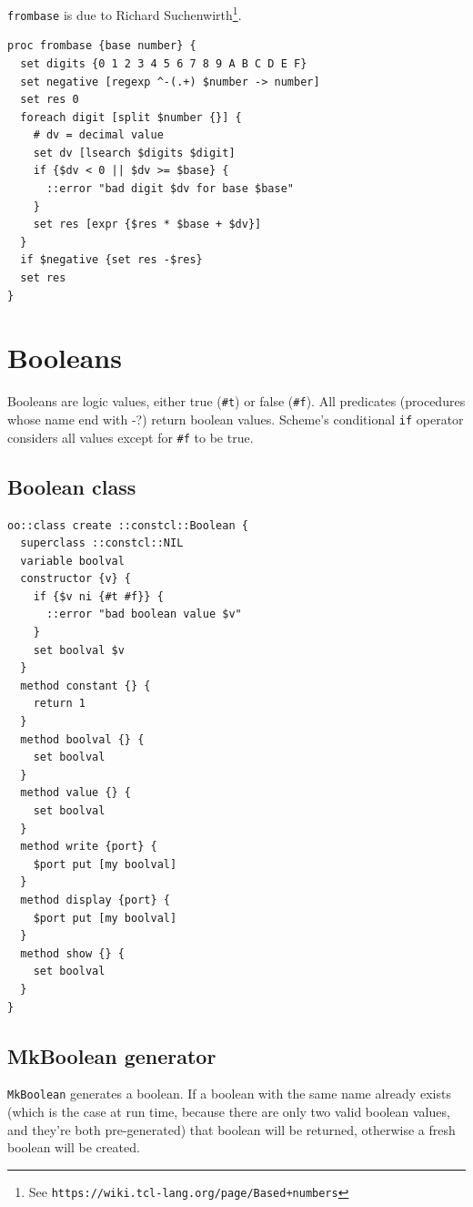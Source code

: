 \documentclass[twoside,9pt]{report}
\begin{document}
\texttt{frombase} is due to Richard Suchenwirth\footnote{See \texttt{https://wiki.tcl-lang.org/page/Based+numbers}}.

\begin{lstlisting}
proc frombase {base number} {
  set digits {0 1 2 3 4 5 6 7 8 9 A B C D E F}
  set negative [regexp ^-(.+) $number -> number]
  set res 0
  foreach digit [split $number {}] {
    # dv = decimal value
    set dv [lsearch $digits $digit]
    if {$dv < 0 || $dv >= $base} {
      ::error "bad digit $dv for base $base"
    }
    set res [expr {$res * $base + $dv}]
  }
  if $negative {set res -$res}
  set res
}
\end{lstlisting}
\section{Booleans}
\label{booleans}


Booleans are logic values, either true (\texttt{\#t}) or false (\texttt{\#f}). All predicates (procedures whose name end with -?) return boolean values. Scheme's conditional \texttt{if} operator considers all values except for \texttt{\#f} to be true.

\subsection{Boolean class}
\label{boolean-class}
\begin{lstlisting}
oo::class create ::constcl::Boolean {
  superclass ::constcl::NIL
  variable boolval
  constructor {v} {
    if {$v ni {#t #f}} {
      ::error "bad boolean value $v"
    }
    set boolval $v
  }
  method constant {} {
    return 1
  }
  method boolval {} {
    set boolval
  }
  method value {} {
    set boolval
  }
  method write {port} {
    $port put [my boolval]
  }
  method display {port} {
    $port put [my boolval]
  }
  method show {} {
    set boolval
  }
}
\end{lstlisting}
\subsection{MkBoolean generator}
\label{mkboolean-generator}


\texttt{MkBoolean} generates a boolean. If a boolean with the same name already exists (which is the case at run time, because there are only two valid boolean values, and they're both pre-generated) that boolean will be returned, otherwise a fresh boolean will be created.
\end{document}
